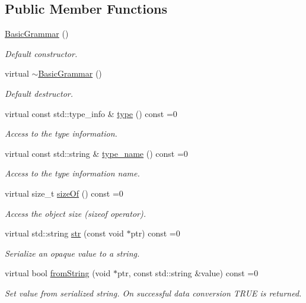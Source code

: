 \subsection*{Public Member Functions}
\begin{DoxyCompactItemize}
\item 
\hyperlink{class_d_d4hep_1_1_basic_grammar_adda1bb3c1b1167a1f81688092a40f02a}{BasicGrammar} ()
\begin{DoxyCompactList}\small\item\em Default constructor. \item\end{DoxyCompactList}\item 
virtual \hyperlink{class_d_d4hep_1_1_basic_grammar_a9110ad3238c79f23fb42cdf69d3322b9}{$\sim$BasicGrammar} ()
\begin{DoxyCompactList}\small\item\em Default destructor. \item\end{DoxyCompactList}\item 
virtual const std::type\_\-info \& \hyperlink{class_d_d4hep_1_1_basic_grammar_a697d38c53f67a86bb182350dad284402}{type} () const =0
\begin{DoxyCompactList}\small\item\em Access to the type information. \item\end{DoxyCompactList}\item 
virtual const std::string \& \hyperlink{class_d_d4hep_1_1_basic_grammar_acae3770beb2e60eaf76c7d85722c8bc2}{type\_\-name} () const =0
\begin{DoxyCompactList}\small\item\em Access to the type information name. \item\end{DoxyCompactList}\item 
virtual size\_\-t \hyperlink{class_d_d4hep_1_1_basic_grammar_a5e2ae03f6371357d3da7e082bbeabb0d}{sizeOf} () const =0
\begin{DoxyCompactList}\small\item\em Access the object size (sizeof operator). \item\end{DoxyCompactList}\item 
virtual std::string \hyperlink{class_d_d4hep_1_1_basic_grammar_a92fb01e1333540f417ef8151e774fd72}{str} (const void $\ast$ptr) const =0
\begin{DoxyCompactList}\small\item\em Serialize an opaque value to a string. \item\end{DoxyCompactList}\item 
virtual bool \hyperlink{class_d_d4hep_1_1_basic_grammar_adf08fd5e01cf623c8b0e239bbe0b1868}{fromString} (void $\ast$ptr, const std::string \&value) const =0
\begin{DoxyCompactList}\small\item\em Set value from serialized string. On successful data conversion TRUE is returned. \item\end{DoxyCompactList}\end{DoxyCompactItemize}
